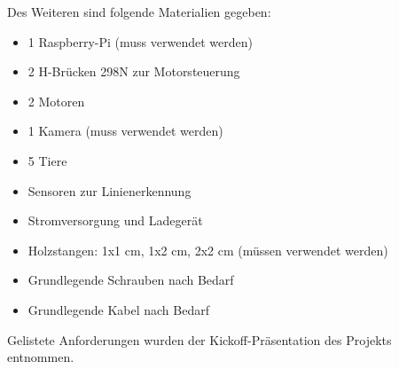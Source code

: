 Des Weiteren sind folgende Materialien gegeben:

\begin{itemize}
    \item 1 Raspberry-Pi (muss verwendet werden)
    \item 2 H-Brücken 298N zur Motorsteuerung
    \item 2 Motoren
    \item 1 Kamera (muss verwendet werden)
    \item 5 Tiere
    \item Sensoren zur Linienerkennung
    \item Stromversorgung und Ladegerät
    \item Holzstangen: 1x1 cm, 1x2 cm, 2x2 cm (müssen verwendet werden)
    \item Grundlegende Schrauben nach Bedarf
    \item Grundlegende Kabel nach Bedarf 
\end{itemize}

Gelistete Anforderungen wurden der Kickoff-Präsentation des Projekts entnommen.
